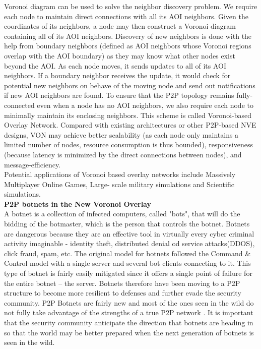 \documentclass[12pt]{article}
\begin{document}
Voronoi diagram can be used to solve the neighbor discovery problem. We require each node to maintain direct connections with all its AOI neighbors. Given the coordinates of its neighbors, a node may then construct a Voronoi diagram containing all of its AOI neighbors. Discovery of new neighbors is done with the help from boundary neighbors (defined as AOI neighbors whose Voronoi regions overlap with the AOI boundary) as they may know what other nodes exist beyond the AOI. As each node moves, it sends updates to all of its AOI neighbors. If a boundary neighbor receives the update, it would check for potential new neighbors on behave of the moving node and send out notifications if new AOI neighbors are found. To ensure that the P2P topology remains fully-connected even when a node has no AOI neighbors, we also require each node to minimally maintain its enclosing neighbors. This scheme is called Voronoi-based Overlay Network. Compared with existing architectures or other P2P-based NVE designs, VON may achieve better scalability (as each node only maintains a limited number of nodes, resource consumption is thus bounded), responsiveness (because latency is minimized by the direct connections between nodes), and message-efficiency.\cite{DBLP:conf/waim/ZhengH05} \\

Potential applications of Voronoi based overlay networks include Massively Multiplayer Online Games, Large- scale military simulations and Scientific simulations.\\

{ \bf P2P botnets in the New Voronoi Overlay}\\

A botnet is a collection of infected computers, called "bots", that will do the bidding of the botmaster, which is the person that controls the botnet. Botnets are dangerous because they are an effective tool in virtually every cyber criminal activity imaginable - identity theft, distributed denial od service attacks(DDOS), click fraud, spam, etc. The original model for botnets followed the Command & Control model with a single server and several bot clients connecting to it. This type of botnet is fairly easily mitigated since it offers a single point of failure for the entire botnet – the server. Botnets therefore have been moving to a P2P structure to become more resilient to defenses and further evade the security community. P2P Botnets are fairly new and most of the ones seen in the wild do not fully take advantage of the strengths of a true P2P network . It is important that the security community anticipate the direction that botnets are heading in so that the world may be better prepared when the next generation of botnets is seen in the wild\cite{peertopeerbotnets}.\\
\end{document}
